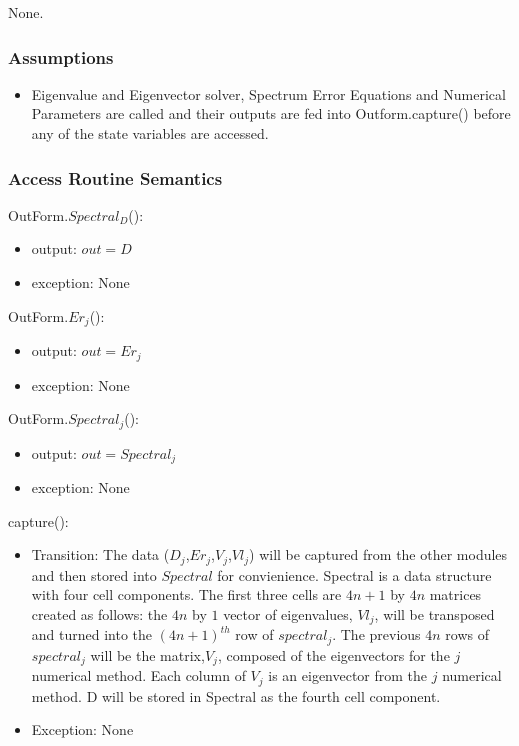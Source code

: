 \documentclass[12pt, titlepage]{article}
\begin{document}
None.

\subsubsection{Assumptions}

\begin{itemize}
	\item Eigenvalue and Eigenvector solver, Spectrum Error Equations and 
	Numerical Parameters 
	are called and their outputs are fed into Outform.capture() 
	before any of the state variables are accessed. 
\end{itemize}

\subsubsection{Access Routine Semantics}

\noindent OutForm.$Spectral_{D}$():
\begin{itemize}
	\item output: $out = D$
	\item exception: None
\end{itemize}

\noindent OutForm.$Er_{j}$():
\begin{itemize}
	\item output: $out = Er_{j}$
	\item exception: None
\end{itemize} 

\noindent OutForm.$Spectral_{j}$():
\begin{itemize}
	\item output: $out = Spectral_{j}$
	\item exception: None
\end{itemize}

\noindent capture():
\begin{itemize}
	\item Transition: The data ($D_{j}$,$Er_{j}$,$V_{j}$,$Vl_{j}$) will be 
	captured from the other 
	modules and then stored into $Spectral$ for convienience. Spectral is a 
	data 
	structure with four cell components. The first three cells are
	$4n+1$ by $4n$ matrices created as follows: the $4n$ by $1$ vector of 
	eigenvalues, $Vl_j$, will be transposed and turned into the $(4n+1)^{th}$ 
	row 
	of 
	$spectral_{j}$. The previous $4n$ rows of $spectral_{j}$ will be the 
	matrix,$ 
	V_j$, 
	composed 
	of the eigenvectors for the $j$ numerical method. Each column of $V_j$ is 
	an eigenvector from the $j$ numerical method. D will be stored in Spectral 
	as the fourth 
	cell component.  
	\item Exception: None
\end{itemize}  
\end{document}
